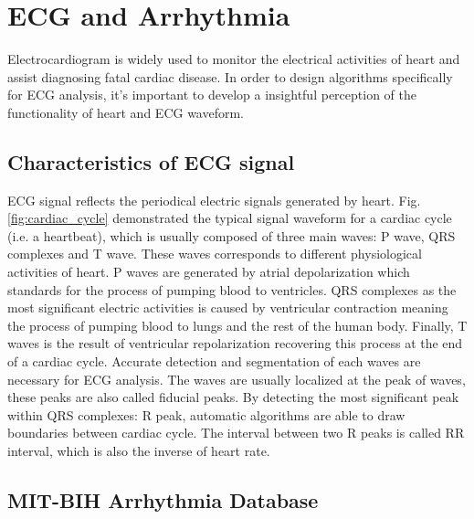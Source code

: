 \section{ECG and Arrhythmia}

Electrocardiogram is widely used to monitor the electrical activities of heart and assist diagnosing fatal cardiac disease. In order to design algorithms specifically for ECG analysis, it's important to develop a insightful perception of the functionality of heart and ECG waveform.  

\subsection{Characteristics of ECG signal}

ECG signal reflects the periodical electric signals generated by heart. Fig.\ref{fig:cardiac_cycle} demonstrated the typical signal waveform for a cardiac cycle (i.e. a heartbeat), which is usually composed of three main waves: P wave, QRS complexes and T wave. These waves corresponds to different physiological activities of heart. P waves are generated by atrial depolarization which standards for the process of pumping blood to ventricles. QRS complexes as the most significant electric activities is caused by ventricular contraction meaning the process of pumping blood to lungs and the rest of the human body. Finally, T waves is the result of ventricular repolarization recovering this process at the end of a cardiac cycle. Accurate detection and segmentation of each waves are necessary for ECG analysis. The waves are usually localized at the peak of waves, these peaks are also called fiducial peaks. By detecting the most significant peak within QRS complexes: R peak, automatic algorithms are able to draw boundaries between cardiac cycle. The interval between two R peaks is called RR interval, which is also the inverse of heart rate.

\subsection{MIT-BIH Arrhythmia Database}

